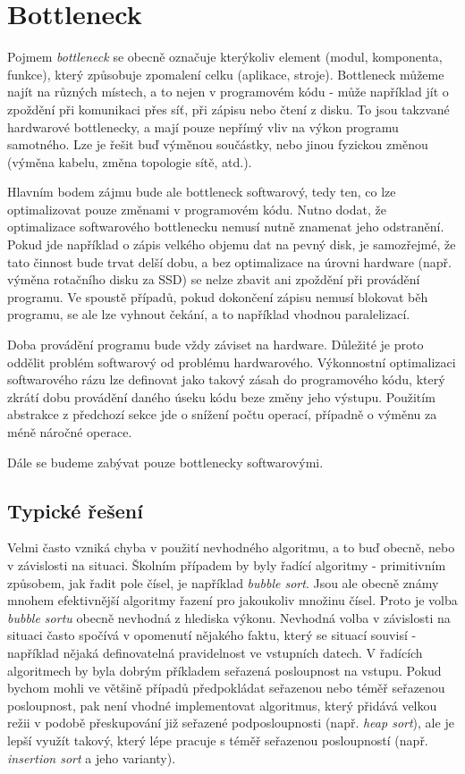 \documentclass[czech,BP]{thesiskiv}
\begin{document}
\section{Bottleneck}

Pojmem \emph{bottleneck} se obecně označuje kterýkoliv element (modul, komponenta, funkce), který způsobuje zpomalení celku (aplikace, stroje). Bottleneck můžeme najít na různých místech, a to nejen v programovém kódu - může například jít o zpoždění při komunikaci přes síť, při zápisu nebo čtení z disku. To jsou takzvané hardwarové bottlenecky, a mají pouze nepřímý vliv na výkon programu samotného. Lze je řešit buď výměnou součástky, nebo jinou fyzickou změnou (výměna kabelu, změna topologie sítě, atd.).

Hlavním bodem zájmu bude ale bottleneck softwarový, tedy ten, co lze optimalizovat pouze změnami v programovém kódu. Nutno dodat, že optimalizace softwarového bottlenecku nemusí nutně znamenat jeho odstranění. Pokud jde například o zápis velkého objemu dat na pevný disk, je samozřejmé, že tato činnost bude trvat delší dobu, a bez optimalizace na úrovni hardware (např. výměna rotačního disku za SSD) se nelze zbavit ani zpoždění při provádění programu. Ve spoustě případů, pokud dokončení zápisu nemusí blokovat běh programu, se ale lze vyhnout čekání, a to například vhodnou paralelizací.

Doba provádění programu bude vždy záviset na hardware. Důležité je proto oddělit problém softwarový od problému hardwarového. Výkonnostní optimalizaci softwarového rázu lze definovat jako takový zásah do programového kódu, který zkrátí dobu provádění daného úseku kódu beze změny jeho výstupu. Použitím abstrakce z předchozí sekce jde o snížení počtu operací, případně o výměnu za méně náročné operace.

Dále se budeme zabývat pouze bottlenecky softwarovými.

\subsection{Typické řešení}

Velmi často vzniká chyba v použití nevhodného algoritmu, a to buď obecně, nebo v závislosti na situaci. Školním případem by byly řadící algoritmy - primitivním způsobem, jak řadit pole čísel, je například \emph{bubble sort}. Jsou ale obecně známy mnohem efektivnější algoritmy řazení pro jakoukoliv množinu čísel. Proto je volba \emph{bubble sortu} obecně nevhodná z hlediska výkonu. Nevhodná volba v závislosti na situaci často spočívá v opomenutí nějakého faktu, který se situací souvisí - například nějaká definovatelná pravidelnost ve vstupních datech. V řadících algoritmech by byla dobrým příkladem seřazená posloupnost na vstupu. Pokud bychom mohli ve většině případů předpokládat seřazenou nebo téměř seřazenou posloupnost, pak není vhodné implementovat algoritmus, který přidává velkou režii v podobě přeskupování již seřazené podposloupnosti (např. \emph{heap sort}), ale je lepší využít takový, který lépe pracuje s téměř seřazenou posloupností (např. \emph{insertion sort} a jeho varianty).
\end{document}
